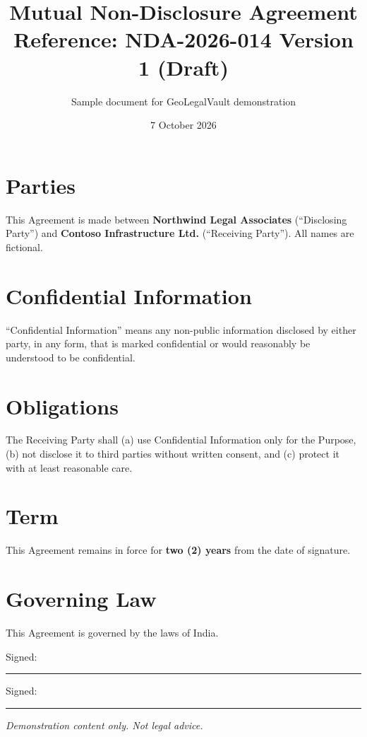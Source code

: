 \documentclass[11pt,a4paper]{article}
\title{\textbf{Mutual Non-Disclosure Agreement}\\[2pt]\large Reference: NDA-2026-014 \quad Version 1 (Draft)}
\author{Sample document for GeoLegalVault demonstration}
\date{7 October 2026}
\begin{document}
\maketitle

\section*{Parties}
This Agreement is made between \textbf{Northwind Legal Associates} (``Disclosing Party'') and
\textbf{Contoso Infrastructure Ltd.} (``Receiving Party''). All names are fictional.

\section{Confidential Information}
``Confidential Information'' means any non-public information disclosed by either party, in any
form, that is marked confidential or would reasonably be understood to be confidential.

\section{Obligations}
The Receiving Party shall (a) use Confidential Information only for the Purpose, (b) not disclose it
to third parties without written consent, and (c) protect it with at least reasonable care.

\section{Term}
This Agreement remains in force for \textbf{two (2) years} from the date of signature.

\section{Governing Law}
This Agreement is governed by the laws of India.

\vspace{2cm}
\noindent Signed: \rule{5cm}{0.4pt} \hfill Signed: \rule{5cm}{0.4pt}

\medskip
\small\textit{Demonstration content only. Not legal advice.}
\end{document}

